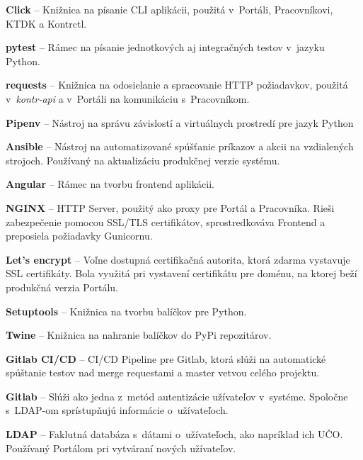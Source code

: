\documentclass[
  digital, %
  oneside, %
  table,   %
  lof,     %
  lot,   %
]{fithesis3}
\begin{document}
\textbf{Click} -- Knižnica na písanie CLI aplikácii, použitá v~Portáli, Pracovníkovi, KTDK a Kontrctl.

\textbf{pytest} -- Rámec na písanie jednotkových aj integračných testov v~jazyku Python.

\textbf{requests} -- Knižnica na odosielanie a spracovanie HTTP požiadavkov, použitá v~\emph{kontr-api} a v~Portáli na komunikáciu s~Pracovníkom.

\textbf{Pipenv} -- Nástroj na správu závislostí a virtuálnych prostredí pre jazyk Python

\textbf{Ansible} -- Nástroj na automatizované spúšťanie príkazov a akcii na vzdialených strojoch. Používaný na aktualizáciu produkčnej verzie systému.

\textbf{Angular} -- Rámec na tvorbu frontend aplikácii.

\textbf{NGINX} -- HTTP Server, použitý ako proxy pre Portál a Pracovníka. Rieši zabezpečenie pomocou SSL/TLS certifikátov, sprostredkováva Frontend a preposiela požiadavky Gunicornu.

\textbf{Let's encrypt} -- Voľne dostupná certifikačná autorita, ktorá zdarma vystavuje SSL certifikáty. Bola využitá pri vystavení certifikátu pre doménu, na ktorej beží produkčná verzia Portálu.

\textbf{Setuptools} -- Knižnica na tvorbu balíčkov pre Python.

\textbf{Twine} -- Knižnica na nahranie balíčkov do PyPi repozitárov.

\textbf{Gitlab CI/CD} -- CI/CD Pipeline pre Gitlab, ktorá slúži na automatické spúštanie testov nad merge requestami a master vetvou celého projektu.

\textbf{Gitlab} -- Slúži ako jedna z~metód autentizácie užívateľov v~systéme. Spoločne s~LDAP-om sprístupňujú informácie o~užívateľoch.

\textbf{LDAP} -- Faklutná databáza s~dátami o~užívateľoch, ako napríklad ich UČO. Používaný Portálom pri vytváraní nových užívateľov.
\end{document}
